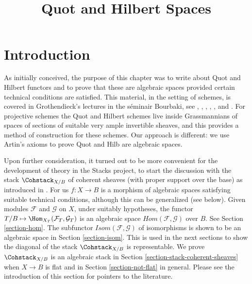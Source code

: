 

%


\title{Quot and Hilbert Spaces}

\maketitle

\label{section-phantom}

\tableofcontents




\section{Introduction}
\label{section-introduction}

\noindent
As initially conceived, the purpose of this chapter was to write about
Quot and Hilbert functors and to prove that these are algebraic spaces
provided certain technical conditions are satisfied. This material, in
the setting of schemes, is
covered in Grothendieck's lectures in the s\'eminair Bourbaki, see
\cite{Gr-I},
\cite{Gr-II},
\cite{Gr-III},
\cite{Gr-IV},
\cite{Gr-V}, and
\cite{Gr-VI}. For projective schemes the Quot and Hilbert schemes
live inside Grassmannians of spaces of sections of suitable very
ample invertible sheaves, and this provides a method of construction
for these schemes. Our approach is different: we use Artin's axioms to
prove Quot and Hilb are algebraic spaces.

\medskip\noindent
Upon further consideration, it turned out to be more convenient for
the development of theory in the Stacks project, to start the
discussion with the stack $\Cohstack_{X/B}$
of coherent sheaves (with proper support over the base)
as introduced in \cite{lieblich_remarks}. For us $f : X \to B$
is a morphism of algebraic spaces satisfying suitable
technical conditions, although this can be generalized (see below).
Given modules $\mathcal{F}$ and $\mathcal{G}$
on $X$, under suitably hypotheses, the functor
$T/B \mapsto \Hom_{X_T}(\mathcal{F}_T, \mathcal{G}_T)$
is an algebraic space $\mathit{Hom}(\mathcal{F}, \mathcal{G})$
over $B$. See Section \ref{section-hom}. The subfunctor
$\mathit{Isom}(\mathcal{F}, \mathcal{G})$ of isomorphisms is
shown to be an algebraic space in Section \ref{section-isom}.
This is used in the next sections to show the diagonal of
the stack $\Cohstack_{X/B}$ is representable. We prove
$\Cohstack_{X/B}$ is an algebraic stack in
Section \ref{section-stack-coherent-sheaves} when $X \to B$ is flat
and in Section \ref{section-not-flat} in general.
Please see the introduction of this section for pointers
to the literature.


